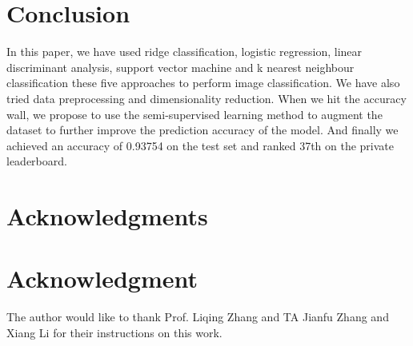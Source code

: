 \documentclass[10pt,journal,compsoc]{IEEEtran}
\begin{document}
\section{Conclusion}
\label{sec:conclusion}

In this paper, we have used ridge classification, logistic regression, linear discriminant analysis, support vector machine and k nearest neighbour classification these five approaches to perform image classification. We have also tried data preprocessing and dimensionality reduction. When we hit the accuracy wall, we propose to use the semi-supervised learning method to augment the dataset to further improve the prediction accuracy of the model. And finally we achieved an accuracy of 0.93754 on the test set and ranked 37th on the private leaderboard.


\ifCLASSOPTIONcompsoc
  \section*{Acknowledgments}
\else
  \section*{Acknowledgment}
\fi


The author would like to thank Prof. Liqing Zhang and TA Jianfu Zhang and Xiang Li for their instructions on this work.


\ifCLASSOPTIONcaptionsoff
  \newpage
\fi





%
%
%

\end{document}
